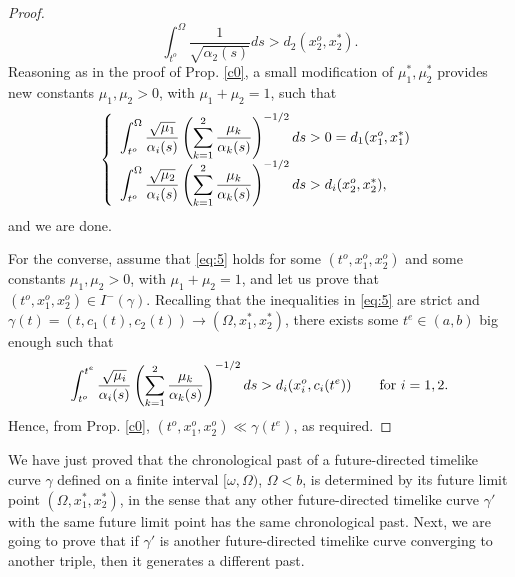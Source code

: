 \begin{proof}
      \[
\int_{t^o}^{\Omega}\frac{1}{\sqrt{\alpha_2(s)}}ds>d_2(x_2^o,x_2^*).
        \]
        Reasoning as in the proof of Prop. \ref{c0}, a small modification of $\mu_1^*,\mu_2^*$ provides new constants $\mu_1,\mu_2>0$, with $\mu_1+\mu_2=1$, such that
\[
          \left\{\begin{array}{ll}\displaystyle
\int_{t^{o}}^{\Omega} \frac{\sqrt{\mu_{1}}}{\alpha_{i}(s)}\left(\sum_{k=1}^{2} \frac{\mu_{k}}{\alpha_{k}(s)} \right)^{-1/2}ds>0= d_1(x_1^o,x_1^*)\\
                   \displaystyle\int_{t^{o}}^{\Omega} \frac{\sqrt{\mu_{2}}}{\alpha_{i}(s)}\left(\sum_{k=1}^{2} \frac{\mu_{k}}{\alpha_{k}(s)} \right)^{-1/2}ds> d_i(x_2^o,x_2^*),

            \end{array}
          \right.
          \]
          and we are done.

          \smallskip

          For the converse, assume that \eqref{eq:5} holds for some $(t^o,x_1^o,x_2^o)$ and some constants $\mu_1,\mu_2>0$, with $\mu_1+\mu_2=1$, and let us prove that $(t^o,x^o_1,x^o_2)\in I^-(\gamma)$. Recalling that the inequalities in \eqref{eq:5} are strict and $\gamma(t)=(t,c_1(t),c_2(t))\rightarrow (\Omega,x_1^*,x_2^*)$, there exists some $t^e\in (a,b)$ big enough such that
 \[\int_{t^{o}}^{t^e} \frac{\sqrt{\mu_{i}}}{\alpha_{i}(s)}\left(\sum_{k=1}^{2} \frac{\mu_{k}}{\alpha_{k}(s)} \right)^{-1/2}ds >
d_{i}(x^{o}_{i},c_{i}(t^e))\qquad\hbox{for $i=1,2$.}
\]
Hence, from Prop. \ref{c0}, $(t^o,x^o_1,x^o_2)\ll \gamma(t^e)$, as required.


\end{proof}

We have just proved that the chronological past of a future-directed timelike curve $\gamma$ defined on a finite interval $[\omega,\Omega)$, $\Omega<b$, is determined by its future limit point $(\Omega,x^*_1,x^*_2)$, in the sense that any other future-directed timelike curve $\gamma'$ with the same future limit point has the same chronological past. Next, we are going to prove that if $\gamma'$ is another future-directed timelike curve converging to another triple, then it generates a different past.

